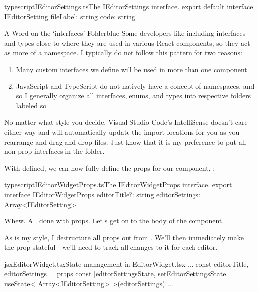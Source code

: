 \documentclass[a4paper,headinclude=on,footinclude=on,12pt,oneside]{scrbook}
\begin{document}
\begin{codeInput}{typescript}{IEditorSettings.ts}{The IEditorSettings interface.}
export default interface IEditorSetting {
  fileLabel: string
  code: string
}  
\end{codeInput}

\begin{highlightBox}{A Word on the `interfaces' Folder}{blue}{\information}
Some developers like including interfaces and types close to where they are used in various React components, so they act as more of a namespace. I typically do not follow this pattern for two reasons:

\begin{enumerate}
  \item Many custom interfaces we define will be used in more than one component
  \item JavaScript and TypeScript do not natively have a concept of namespaces, and so I generally organize all interfaces, enums, and types into respective folders labeled so
\end{enumerate}

No matter what style you decide, Visual Studio Code's IntelliSense doesn't care either way and will automatically update the import locations for you as you rearrange and drag and drop files. Just know that it is my preference to put all non-prop interfaces in the  folder.
\end{highlightBox}

With  defined, we can now fully define the props for our component, :

\begin{codeInput}{typescript}{IEditorWidgetProps.ts}{The IEditorWidgetProps interface.}
export interface IEditorWidgetProps {
  editorTitle?: string
  editorSettings: Array<IEditorSetting>
}
\end{codeInput}

Whew. All done with props. Let's get on to the body of the component.


As is my style, I destructure all props out from . We'll then immediately make the  prop stateful - we'll need to track all changes to it for each editor.

\begin{codeInput}{jsx}{EditorWidget.tsx}{State management in EditorWidget.tsx}
...
const { editorTitle, editorSettings } = props
const [editorSettingsState, setEditorSettingsState] = useState<
  Array<IEditorSetting>
>(editorSettings)
...
\end{codeInput}
\end{document}

